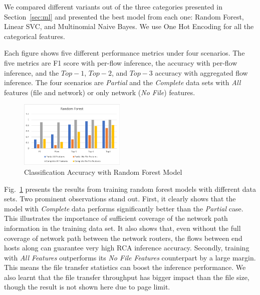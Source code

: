 We compared different variants out of the three categories presented in Section~\ref{sec:ml} and presented the best model from each one: Random Forest, Linear SVC, and Multinomial Naive Bayes.
We use One Hot Encoding for all the categorical features. 

Each figure shows five different performance metrics under four scenarios. The five metrics are F1 score with per-flow inference, the accuracy with per-flow inference, and the $Top-1$, $Top-2$, and $Top-3$ accuracy with
aggregated flow inference. The four scenarios are {\it Partial} and the {\it Complete} data sets with {\it All} features (file and network) or only network ({\it No File}) features.

\begin{figure}[!ht]
\begin{center}
\includegraphics[width=0.45\textwidth]{./figure/rf-accuracy}
\end{center}
\caption{Classification Accuracy with Random Forest Model}
\label{fig:dt}
\end{figure}

Fig.~\ref{fig:dt} presents the results from training random forest models with different data sets. Two prominent observations stand out. 
First, it clearly shows that the model with {\it Complete} data performs significantly better than the {\it Partial} case. This illustrates the importance of sufficient 
coverage of the network path information in the training data set. It also shows that, even without the full coverage of network path between the network routers, 
the flows between end hosts along can guarantee very high RCA inference accuracy.   
Secondly, training with {\it All Features} outperforms its {\it No File Features} counterpart by a large margin. This means the file transfer statistics can boost the inference performance.  
We also learnt that the file transfer throughput has bigger impact than the file size, though the result is not shown here due to page limit. 


